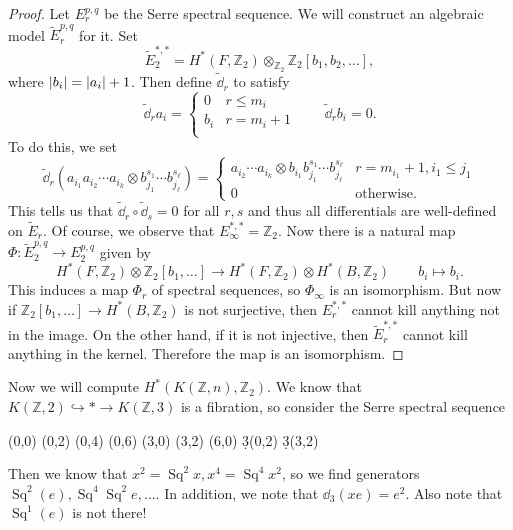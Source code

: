 \documentclass[leqno, openany]{memoir}
\theoremstyle{definition}
\theoremstyle{remark}
\theoremstyle{plain}
\theoremstyle{definition}
\theoremstyle{remark}
\newcommand{\Z}{\mathbb{Z}}
\newcommand{\wt}[1]{\widetilde{#1}}
\DeclareMathOperator{\Sq}{Sq}
\begin{document}
\begin{proof}
    Let $E_r^{p,q}$ be the Serre spectral sequence. We will construct an algebraic model $\wt{E}_r^{p,q}$ for it. Set
    \[ \wt{E}_2^{*,*} = H^* (F, \Z_2) \otimes_{\Z_2} \Z_2 [b_1, b_2, \ldots], \]
    where $\abs{b_i} = \abs{a_i} + 1$. Then define $\wt{\dd}_r$ to satisfy
    \[ \wt{\dd}_r a_i = \begin{cases}
        0 & r \leq m_i \\
        b_i & r = m_i + 1 \\
    \end{cases} \qquad \wt{\dd}_r b_i = 0. \]
    To do this, we set
    \[ \wt{\dd}_r (a_{i_1} a_{i_2} \cdots a_{i_k} \otimes b_{j_1}^{s_1} \cdots b_{j_{\ell}}^{s_{\ell}}) = \begin{cases}
        a_{i_2} \cdots a_{i_k} \otimes b_{i_1} b_{j_1}^{s_1} \cdots b_{j_{\ell}}^{s_{\ell}} & r = m_{i_1} + 1, i_1 \leq j_1 \\
        0 & \text{otherwise}. 
    \end{cases} \]
    This tells us that $\wt{\dd}_r \circ \wt{\dd}_s = 0$ for all $r,s$ and thus all differentials are well-defined on $\wt{E}_r$. Of course, we observe that $E_{\infty}^{*,*} = \Z_2$. Now there is a natural map $\Phi \colon \wt{E}_2^{p,q} \to E_2^{p,q}$ given by
    \[ H^*(F, \Z_2) \otimes \Z_2[b_1, \ldots ] \to H^*(F, \Z_2) \otimes H^*(B, \Z_2) \qquad b_i \mapsto b_i. \]
    This induces a map $\Phi_r$ of spectral sequences, so $\Phi_{\infty}$ is an isomorphism. But now if $\Z_2[b_1, \ldots ] \to H^*(B, \Z_2)$ is not surjective, then $E_r^{*,*}$ cannot kill anything not in the image. On the other hand, if it is not injective, then $\wt{E}_r^{*,*}$ cannot kill anything in the kernel. Therefore the map is an isomorphism.
\end{proof}

Now we will compute $H^*(K(\Z, n), \Z_2)$. We know that $K(\Z, 2) \hookrightarrow * \to K(\Z, 3)$ is a fibration, so consider the Serre spectral sequence
\begin{center}
    \begin{sseqdata}[cohomological Serre grading, classes={draw=none}, name=kz2borel]
        \class["1"](0,0)
        \class["x"](0,2)
        \class["x^2"](0,4)
        \class["x^3"](0,6)
        \class["e"](3,0)
        \class["xe"](3,2)
        \class["e^2"](6,0)
        \d3(0,2)
        \d3(3,2)
    \end{sseqdata}
    \printpage[name=kz2borel, page=3, grid=chess]
\end{center}
Then we know that $x^2 = \Sq^2 x, x^4 = \Sq^4 x^2$, so we find generators $\Sq^2 (e), \Sq^4 \Sq^2 e, \ldots$. In addition, we note that $\dd_3 (x e) = e^2$. Also note that $\Sq^1(e)$ is not there!
\end{document}
